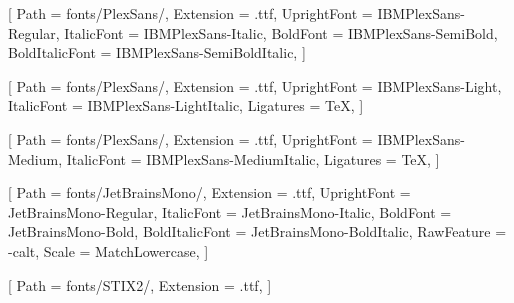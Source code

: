 
\usepackage{fontspec}
\usepackage{unicode-math}

\setmainfont{IBMPlexSans}[
  Path            = fonts/PlexSans/,
  Extension       = .ttf,
  UprightFont     = IBMPlexSans-Regular,
  ItalicFont      = IBMPlexSans-Italic,
  BoldFont        = IBMPlexSans-SemiBold,
  BoldItalicFont  = IBMPlexSans-SemiBoldItalic,
]

\newfontfamily{}[
  Path            = fonts/PlexSans/,
  Extension       = .ttf,
  UprightFont     = IBMPlexSans-Light,
  ItalicFont      = IBMPlexSans-LightItalic,
  Ligatures       = {TeX},
]

\newfontfamily{}[
  Path            = fonts/PlexSans/,
  Extension       = .ttf,
  UprightFont     = IBMPlexSans-Medium,
  ItalicFont      = IBMPlexSans-MediumItalic,
  Ligatures       = {TeX},
]

\setmonofont{JetBrainsMono}[
  Path            = fonts/JetBrainsMono/,
  Extension       = .ttf,
  UprightFont     = JetBrainsMono-Regular,
  ItalicFont      = JetBrainsMono-Italic,
  BoldFont        = JetBrainsMono-Bold,
  BoldItalicFont  = JetBrainsMono-BoldItalic,
  RawFeature      = {-calt},   %
  Scale           = MatchLowercase,
]

[
  Path      = fonts/STIX2/,
  Extension = .ttf,
]

\usepackage{xcolor}

\color{inkblack}

\usepackage[a4paper,margin=2.2cm,headheight=28pt]{geometry}

\usepackage{fancyhdr}
\pagestyle{fancy}
\fancyhf{}
\renewcommand{\headrulewidth}{0.4pt}
\renewcommand{\footrulewidth}{0pt}
\fancyhead[R]{\large\plexmedium\color{slategray}\leftmark}
\fancyfoot[C]{\small\color{slategray}\thepage}

